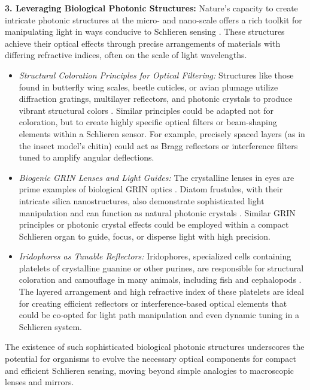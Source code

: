 \documentclass[11pt]{article}
\begin{document}
\textbf{3. Leveraging Biological Photonic Structures:}
Nature's capacity to create intricate photonic structures at the micro- and nano-scale offers a rich toolkit for manipulating light in ways conducive to Schlieren sensing \cite{Kinoshita2008StructuralColors}. These structures achieve their optical effects through precise arrangements of materials with differing refractive indices, often on the scale of light wavelengths.


    \begin{itemize}
        \item \textit{Structural Coloration Principles for Optical Filtering:} Structures like those found in butterfly wing scales, beetle cuticles, or avian plumage utilize diffraction gratings, multilayer reflectors, and photonic crystals to produce vibrant structural colors \cite{Ghiradella1991ButterflyWingOptics, Gorodetsky2020}. Similar principles could be adapted not for coloration, but to create highly specific optical filters or beam-shaping elements within a Schlieren sensor. For example, precisely spaced layers (as in the insect model's chitin) could act as Bragg reflectors or interference filters tuned to amplify angular deflections.
        \item \textit{Biogenic GRIN Lenses and Light Guides:} The crystalline lenses in eyes are prime examples of biological GRIN optics \cite{Land2012AnimalEyes}. Diatom frustules, with their intricate silica nanostructures, also demonstrate sophisticated light manipulation and can function as natural photonic crystals \cite{DeStefano2009DiatomOptics}. Similar GRIN principles or photonic crystal effects could be employed within a compact Schlieren organ to guide, focus, or disperse light with high precision.
        \item \textit{Iridophores as Tunable Reflectors:} Iridophores, specialized cells containing platelets of crystalline guanine or other purines, are responsible for structural coloration and camouflage in many animals, including fish and cephalopods \cite{DeMartini2013}. The layered arrangement and high refractive index of these platelets are ideal for creating efficient reflectors or interference-based optical elements that could be co-opted for light path manipulation and even dynamic tuning in a Schlieren system.
    \end{itemize}
The existence of such sophisticated biological photonic structures underscores the potential for organisms to evolve the necessary optical components for compact and efficient Schlieren sensing, moving beyond simple analogies to macroscopic lenses and mirrors.
\end{document}
